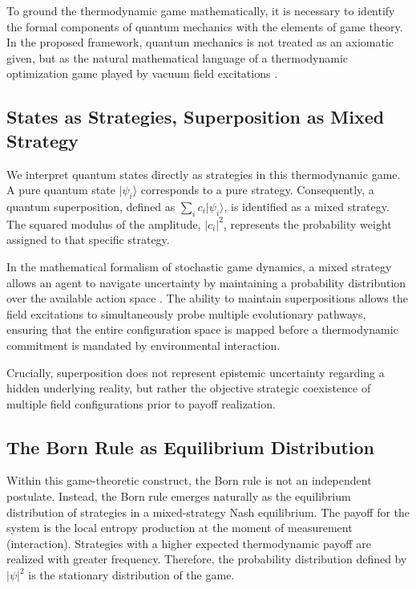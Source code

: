 \documentclass[12pt,a4paper]{article}
\theoremstyle{remark}
\begin{document}
To ground the thermodynamic game mathematically, it is necessary to identify the formal components of quantum mechanics with the elements of game theory. In the proposed framework, quantum mechanics is not treated as an axiomatic given, but as the natural mathematical language of a thermodynamic optimization game played by vacuum field excitations \citep{QuantumStrategies2024}.

\subsection{States as Strategies, Superposition as Mixed Strategy}

We interpret quantum states directly as strategies in this thermodynamic game. A pure quantum state $|\psi_i\rangle$ corresponds to a pure strategy. Consequently, a quantum superposition, defined as $\sum_i c_i |\psi_i\rangle$, is identified as a mixed strategy. The squared modulus of the amplitude, $|c_i|^2$, represents the probability weight assigned to that specific strategy.

In the mathematical formalism of stochastic game dynamics, a mixed strategy allows an agent to navigate uncertainty by maintaining a probability distribution over the available action space \citep{QuantumCognition2015}. The ability to maintain superpositions allows the field excitations to simultaneously probe multiple evolutionary pathways, ensuring that the entire configuration space is mapped before a thermodynamic commitment is mandated by environmental interaction.

Crucially, superposition does not represent epistemic uncertainty regarding a hidden underlying reality, but rather the objective strategic coexistence of multiple field configurations prior to payoff realization.

\subsection{The Born Rule as Equilibrium Distribution}

Within this game-theoretic construct, the Born rule is not an independent postulate. Instead, the Born rule emerges naturally as the equilibrium distribution of strategies in a mixed-strategy Nash equilibrium. The payoff for the system is the local entropy production at the moment of measurement (interaction). Strategies with a higher expected thermodynamic payoff are realized with greater frequency. Therefore, the probability distribution defined by $|\psi|^2$ is the stationary distribution of the game.
\end{document}
